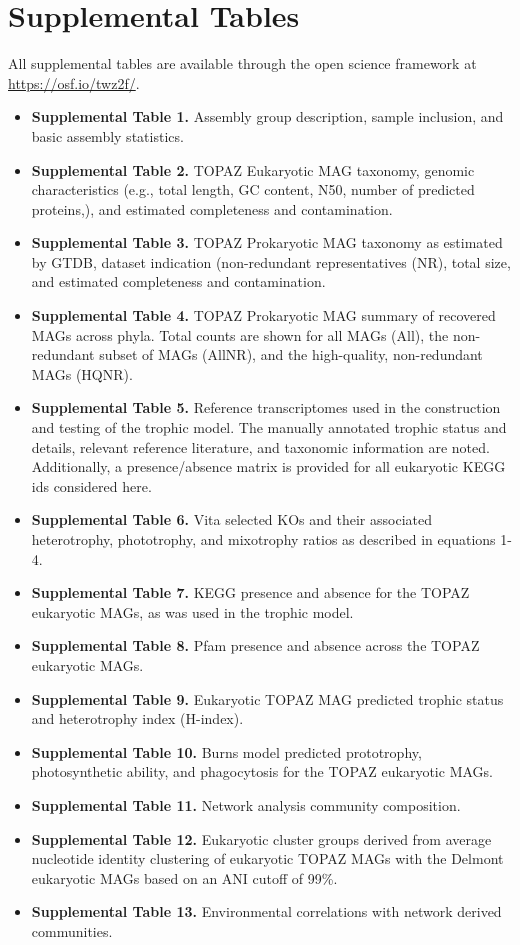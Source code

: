 \documentclass[12pt]{article}
\numberwithin{equation}{section}
\begin{document}
\section*{Supplemental Tables}

All supplemental tables are available through the open science framework at \url{https://osf.io/twz2f/}. 

\begin{itemize}
    \item \textbf{Supplemental Table 1.} Assembly group description, sample inclusion, and basic assembly statistics. 
    \item \textbf{Supplemental Table 2.} TOPAZ Eukaryotic MAG taxonomy, genomic characteristics (e.g., total length, GC content, N50, number of predicted proteins,), and estimated completeness and contamination. 
    \item \textbf{Supplemental Table 3.} TOPAZ Prokaryotic MAG taxonomy as estimated by GTDB, dataset indication (non-redundant representatives (NR), total size, and estimated completeness and contamination. 
    \item \textbf{Supplemental Table 4.} TOPAZ Prokaryotic MAG summary of recovered MAGs across phyla. Total counts are shown for all MAGs (All), the non-redundant subset of MAGs (AllNR), and the high-quality, non-redundant MAGs (HQNR). 
    \item \textbf{Supplemental Table 5.} Reference transcriptomes used in the construction and testing of the trophic model. The manually annotated trophic status and details, relevant reference literature, and taxonomic information are noted. Additionally, a presence/absence matrix is provided for all eukaryotic KEGG ids considered here. 
    \item \textbf{Supplemental Table 6.} Vita selected KOs and their associated heterotrophy, phototrophy, and mixotrophy ratios as described in equations 1-4. 
    \item \textbf{Supplemental Table 7.}  KEGG presence and absence for the TOPAZ eukaryotic MAGs, as was used in the trophic model. 
    \item \textbf{Supplemental Table 8.} Pfam presence and absence across the TOPAZ eukaryotic MAGs. 
    \item \textbf{Supplemental Table 9.} Eukaryotic TOPAZ MAG predicted trophic status and heterotrophy index (H-index). 
    \item \textbf{Supplemental Table 10.} Burns model \citep{burns2018gene} predicted prototrophy, photosynthetic ability, and phagocytosis for the TOPAZ eukaryotic MAGs. 
    \item \textbf{Supplemental Table 11.} Network analysis community composition. 
    \item \textbf{Supplemental Table 12.} Eukaryotic cluster groups derived from average nucleotide identity clustering of eukaryotic TOPAZ MAGs with the Delmont eukaryotic MAGs \citep{Delmont_2020} based on an ANI cutoff of 99\%. 
    \item \textbf{Supplemental Table 13.} Environmental correlations with network derived communities. 
\end{itemize}
\end{document}
